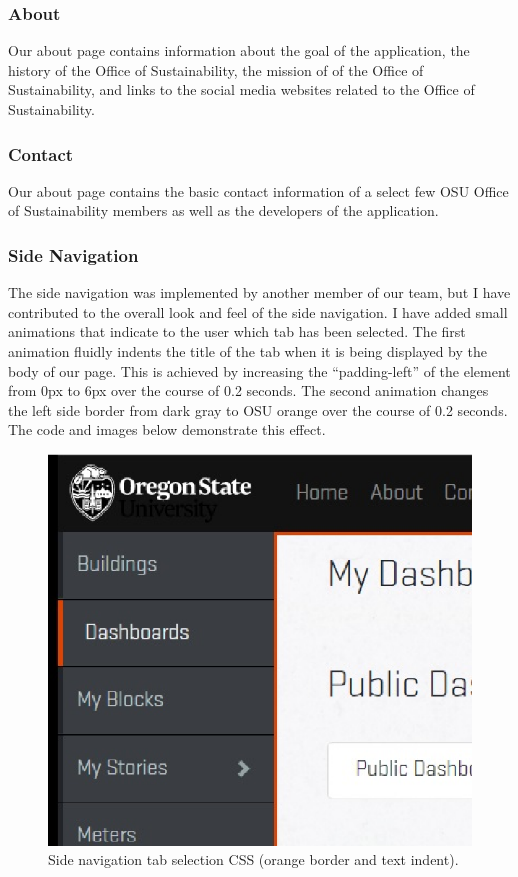 \documentclass[letterpaper,10pt,serif,draftclsnofoot,onecolumn,compsoc,titlepage]{IEEEtran}
\begin{document}
			\subsubsection{About}
			Our about page contains information about the goal of the application, the history of the Office of Sustainability, the mission of of the Office of Sustainability,
			and links to the social media websites related to the Office of Sustainability.
			\subsubsection{Contact}
			Our about page contains the basic contact information of a select few OSU Office of Sustainability members as well as the developers of the application.
			
	\subsubsection{Side Navigation}
	The side navigation was implemented by another member of our team, but I have contributed to the overall look and feel of the side navigation. I have added small
	animations that indicate to the user which tab has been selected. The first animation fluidly indents the title of the tab when it is being displayed by the 
	body of our page. This is achieved by increasing the ``padding-left'' of the element from 0px to 6px over the course of 0.2 seconds. The second animation changes the 
	left side border from dark gray to OSU orange over the course of 0.2 seconds. The code and images below demonstrate this effect.
	
	\begin{figure}[H]
		\centering
		\includegraphics[width=17cm]{images/side-nav-css.eps}
		\caption{Side navigation tab selection CSS (orange border and text indent).}
	\end{figure}
	
\end{document}
